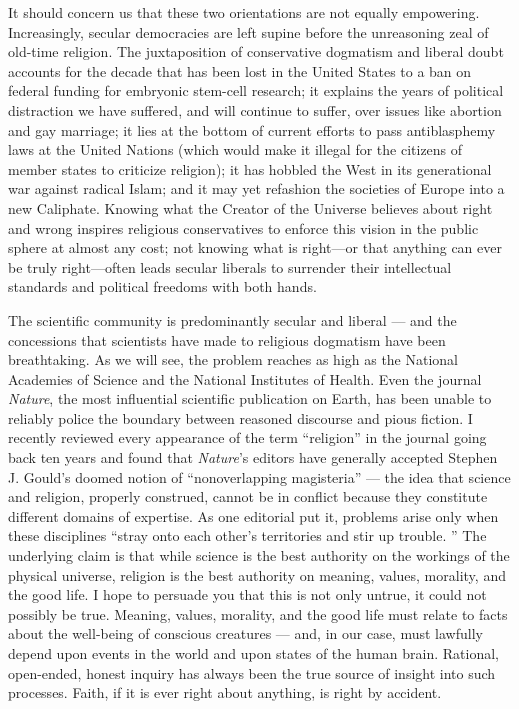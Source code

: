 \documentclass[a4paper,12pt]{extbook}
\begin{document}
It should concern us that these two orientations are not equally empowering.
Increasingly, secular democracies are left supine before the unreasoning zeal of old-time religion.
The juxtaposition of conservative dogmatism and liberal doubt accounts for the decade that has been lost in the United States to a ban on federal funding for embryonic stem-cell research;
it explains the years of political distraction we have suffered, and will continue to suffer, over issues like abortion and gay marriage;
it lies at the bottom of current efforts to pass antiblasphemy laws at the United Nations (which would make it illegal for the citizens of member states to criticize religion);
it has hobbled the West in its generational war against radical Islam;
and it may yet refashion the societies of Europe into a new Caliphate.
Knowing what the Creator of the Universe believes about right and wrong inspires religious conservatives to enforce this vision in the public sphere at almost any cost; not knowing what is right—or that anything can ever be truly right—often leads secular liberals to surrender their intellectual standards and political freedoms with both hands.

The scientific community is predominantly secular and liberal --- and the concessions that scientists have made to religious dogmatism have been breathtaking.
As we will see, the problem reaches as high as the National Academies of Science and the National Institutes of Health.
Even the journal \textit{Nature}, the most influential scientific publication on Earth, has been unable to reliably police the boundary between reasoned discourse and pious fiction.
I recently reviewed every appearance of the term ``religion'' in the journal going back ten years and found that \textit{Nature}’s editors have generally accepted Stephen J. Gould’s doomed notion of ``nonoverlapping magisteria'' --- the idea that science and religion, properly construed, cannot be in conflict because they constitute different domains of expertise.
As one editorial put it, problems arise only when these disciplines ``stray onto each other’s territories and stir up trouble. ''
The underlying claim is that while science is the best authority on the workings of the physical universe, religion is the best authority on meaning, values, morality, and the good life.
I hope to persuade you that this is not only untrue, it could not possibly be true.
Meaning, values, morality, and the good life must relate to facts about the well-being of conscious creatures --- and, in our case, must lawfully depend upon events in the world and upon states of the human brain.
Rational, open-ended, honest inquiry has always been the true source of insight into such processes.
Faith, if it is ever right about anything, is right by accident.
\end{document}
